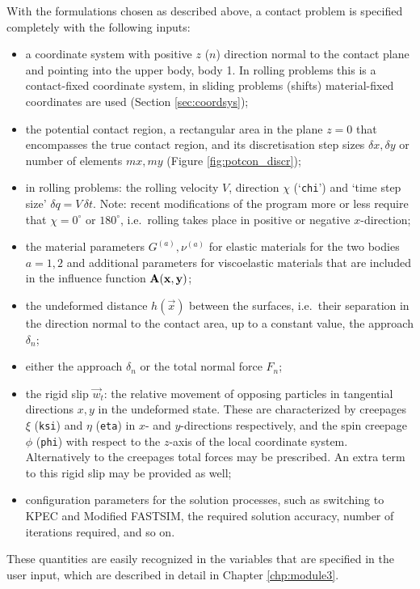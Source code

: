 \documentclass[12pt]{report}
\begin{document}
With the formulations chosen as described above, a contact problem is
specified completely with the following inputs:
\begin{itemize}
\item a coordinate system with positive $z$ ($n$) direction normal to the
        contact plane and pointing into the upper body, body 1. In
        rolling problems this is a contact-fixed coordinate system,
        in sliding problems (shifts) material-fixed coordinates are
        used (Section \ref{sec:coordsys});
\item the potential contact region, a rectangular area in the plane $z=0$
        that encompasses the true contact region, and its discretisation
        step sizes $\delta x,\delta y$ or number of elements $mx,my$
        (Figure \ref{fig:potcon_discr});
\item in rolling problems: the rolling velocity $V$, direction $\chi$
        (`{\tt chi}') and `time step size' $\delta q=V\,\delta t$.
        Note: recent modifications of the program more or less require
        that $\chi=0^\circ$ or $180^\circ$, i.e.\ rolling takes place in
        positive or negative $x$-direction;
\item the material parameters $G^{(a)}, \nu^{(a)}$ for elastic materials
        for the two bodies $a=1,2$ and additional parameters for viscoelastic
        materials that are included in the influence function
        $\mathbf{A}(\mathbf{x},\mathbf{y})$;
\item the undeformed distance $h(\vec{x})$ between the surfaces, i.e.\ their
        separation in the direction normal to the contact area, up to a
        constant value, the approach $\delta_n$;
\item either the approach $\delta_n$ or the total normal force $F_n$;
\item the rigid slip $\vec{w}_t$:
        the relative movement of opposing particles
        in tangential directions $x,y$ in the undeformed state. These are
        characterized by creepages $\xi$ ({\tt ksi}) and $\eta$ ({\tt eta})
        in $x$- and $y$-directions respectively, and the spin creepage
        $\phi$ ({\tt phi}) with respect to the $z$-axis of the local
        coordinate system. Alternatively to the creepages total forces
        may be prescribed. An extra term to this rigid slip may be
        provided as well;
\item configuration parameters for the solution processes, such as
        switching to KPEC and Modified FASTSIM, the required solution
        accuracy, number of iterations required, and so on.
\end{itemize}
These quantities are easily recognized in the variables that are specified
in the user input, which are described in detail in Chapter
\ref{chp:module3}.
\end{document}
